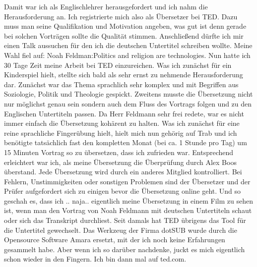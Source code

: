 Damit war ich als Englischlehrer herausgefordert und ich nahm die Herausforderung an. Ich registrierte mich also als Übersetzer bei TED. Dazu muss man seine Qualifikation und Motivation angeben, was gut ist denn gerade bei solchen Vorträgen sollte die Qualität stimmen. Anschließend dürfte ich mir einen Talk aussuchen für den ich die deutschen Untertitel schreiben wollte. Meine Wahl fiel auf: Noah Feldman:Politics and religion are technologies. 
Nun hatte ich 30 Tage Zeit meine Arbeit bei TED einzureichen. Was ich zunächst für ein Kinderspiel hielt, stellte sich bald als sehr ernst zu nehmende Herausforderung dar. Zunächst war das Thema sprachlich sehr komplex und mit Begriffen aus Soziologie, Politik und Theologie gespickt. Zweitens musste die Übersetzung nicht nur möglichst genau sein sondern auch dem Fluss des Vortrags folgen und zu den Englischen Untertiteln passen. Da Herr Feldmann sehr frei redete, war es nicht immer einfach die Übersetzung kohärent zu halten. Was ich zunächst für eine reine sprachliche Fingerübung hielt, hielt mich nun gehörig auf Trab und ich benötigte tatsächlich fast den kompletten Monat (bei ca. 1 Stunde pro Tag) um 15 Minuten Vortrag so zu übersetzen, dass ich zufrieden war. 
Entsprechend erleichtert war ich, als meine Übersetzung die Überprüfung durch Alex Boos überstand. Jede Übersetzung wird durch ein anderes Mitglied kontrolliert. Bei Fehlern, Unstimmigkeiten oder sonstigen Problemen sind der Übersetzer und der Prüfer aufgefordert sich zu einigen bevor die Übersetzung online geht.
Und so geschah es, dass ich .. naja.. eigentlich meine Übersetzung in einem Film zu sehen ist, wenn man den Vortrag von Noah Feldmann mit deutschen Untertiteln schaut oder sich das Transkript durchliest. 
Seit damals hat TED übrigens das Tool für die Untertitel gewechselt. Das Werkzeug der Firma dotSUB wurde durch die Opensource Software Amara ersetzt, mit der ich noch keine Erfahrungen gesammelt habe. Aber wenn ich so darüber nachdenke, juckt es mich eigentlich schon wieder in den Fingern. Ich bin dann mal auf ted.com.


